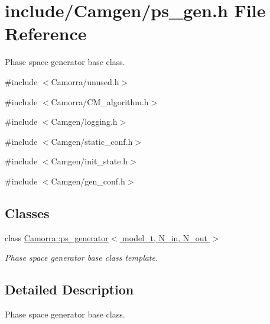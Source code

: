 \hypertarget{a00581}{
\section{include/Camgen/ps\_\-gen.h File Reference}
\label{a00581}
}


Phase space generator base class.  


{\ttfamily \#include $<$Camorra/unused.h$>$}\par
{\ttfamily \#include $<$Camorra/CM\_\-algorithm.h$>$}\par
{\ttfamily \#include $<$Camgen/logging.h$>$}\par
{\ttfamily \#include $<$Camgen/static\_\-conf.h$>$}\par
{\ttfamily \#include $<$Camgen/init\_\-state.h$>$}\par
{\ttfamily \#include $<$Camgen/gen\_\-conf.h$>$}\par
\subsection*{Classes}
\begin{DoxyCompactItemize}
\item 
class \hyperlink{a00406}{Camorra::ps\_\-generator$<$ model\_\-t, N\_\-in, N\_\-out $>$}
\begin{DoxyCompactList}\small\item\em Phase space generator base class template. \end{DoxyCompactList}\end{DoxyCompactItemize}


\subsection{Detailed Description}
Phase space generator base class. 